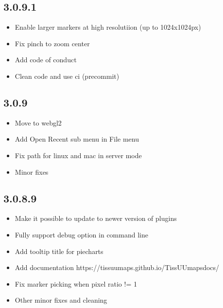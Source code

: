 \documentclass[letterpaper,10pt,english,openany,oneside]{sphinxmanual}
\begin{document}
\subsection{3.0.9.1}
\label{\detokenize{docs/intro/versions:id3}}\begin{itemize}
\item {} 
\sphinxAtStartPar
Enable larger markers at high resolutiion (up to 1024x1024px)

\item {} 
\sphinxAtStartPar
Fix pinch to zoom center

\item {} 
\sphinxAtStartPar
Add code of conduct

\item {} 
\sphinxAtStartPar
Clean code and use ci (pre\sphinxhyphen{}commit)

\end{itemize}


\subsection{3.0.9}
\label{\detokenize{docs/intro/versions:id4}}\begin{itemize}
\item {} 
\sphinxAtStartPar
Move to webgl2

\item {} 
\sphinxAtStartPar
Add Open Recent sub menu in File menu

\item {} 
\sphinxAtStartPar
Fix path for linux and mac in server mode

\item {} 
\sphinxAtStartPar
Minor fixes

\end{itemize}


\subsection{3.0.8.9}
\label{\detokenize{docs/intro/versions:id5}}\begin{itemize}
\item {} 
\sphinxAtStartPar
Make it possible to update to newer version of plugins

\item {} 
\sphinxAtStartPar
Fully support \textendash{}debug option in command line

\item {} 
\sphinxAtStartPar
Add tooltip title for piecharts

\item {} 
\sphinxAtStartPar
Add documentation https://tissuumaps.github.io/TissUUmaps\sphinxhyphen{}docs/

\item {} 
\sphinxAtStartPar
Fix marker picking when pixel ratio != 1

\item {} 
\sphinxAtStartPar
Other minor fixes and cleaning

\end{itemize}
\end{document}
